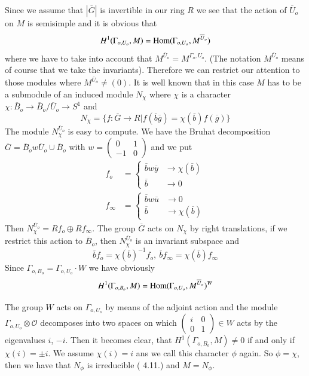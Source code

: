 Since we assume that $|\overline{G}|$ is invertible in our ring $R$ we see that the action of $\overline{U}_{o}$ on $M$ is semisimple and it is obvious that
$$
H^{1}(\Gamma_{o,U_{o}},M)=\operatorname{Hom} (\Gamma_{o,U_{o}},M^{\overline{U}_{o}})
$$
where we have to take into account that $M^{\overline{U}_{o}}=M^{\Gamma_{o},U_{o}}$. (The notation $M^{\overline{U}_{o}}$ means of course that we take the invariants). Therefore we can restrict our attention to those modules where $M^{\overline{U}_{o}}\neq (0)$. It is well known that in this case $M$ has to be a submodule of an induced module $N_{\chi}$ where $\chi$ is a character $\chi:\overline{B}_{o}\to \overline{B}_{o}/\overline{U}_{o}\to S^{1}$ and
$$
N_{\chi}=\{f:\overline{G}\to R|f(\overline{b}\overline{g})=\chi(\overline{b})f(\overline{g})\}
$$
The module $N^{\overline{U}_{o}}_{\chi}$ is easy to compute. We have the Bruhat decomposition $\overline{G}=\overline{B}_{o}w\overline{U}_{o}\cup \overline{B}_{o}$ with $w=\left(\begin{smallmatrix} 0 & 1\\ -1 & 0\end{smallmatrix}\right)$ and we put
\begin{align*}
f_{o} &= 
\begin{cases}
\overline{b}w\overline{y} &\to \chi(\overline{b})\\
\overline{b} &\to 0
\end{cases}\\
f_{\infty} &= 
\begin{cases}
\overline{b}w\overline{u} & \to 0\\
\overline{b} & \to \chi(\overline{b})
\end{cases}
\end{align*}
Then $N^{\overline{U}_{o}}_{\chi}=Rf_{o}\oplus Rf_{\infty}$. The group $\overline{G}$ acts on $N_{\chi}$ by right translations, if we restrict this action to $\overline{B}_{o}$, then $N^{\overline{U}_{o}}_{\chi}$ is an invariant subspace and
$$
\overline{b}f_{o}=\chi(\overline{b})^{-1}f_{o}, \ \overline{b}f_{\infty}=\chi(\overline{b})f_{\infty}
$$
Since $\Gamma_{o,B_{o}}=\Gamma_{o,U_{o}}\cdot W$ we have obviously
$$
H^{1}(\Gamma_{o,B_{o}},M)=\operatorname{Hom}(\Gamma_{o,U_{o}},M^{\overline{U}_{o}})^{W}
$$

The group $W$ acts on $\Gamma_{o,U_{o}}$ by means of the adjoint action and the module\pageoriginale $\Gamma_{o,U_{o}}\otimes \mathscr{O}$ decomposes into two spaces on which $\left(\begin{smallmatrix} i & 0\\ 0 & 1\end{smallmatrix}\right)\in W$ acts by the eigenvalues $i$, $-i$. Then it becomes clear, that $H^{1}(\Gamma_{o,B_{o}},M)\neq 0$ if and only if $\chi(i)=\pm i$. We assume $\chi(i)=i$ ans we call this character $\phi$ again. So $\phi=\chi$, then we have that $N_{\phi}$ is irreducible (\cite{art2-key25} 4.11.) and $M=N_{\phi}$.

